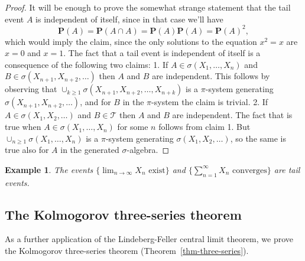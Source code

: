 \documentclass[12pt]{article}
\newcommand{\prob}{\mathbf{P}}
\theoremstyle{example}
\newtheorem{example}[thm]{Example}
\begin{document}
\begin{proof}
It will be enough to prove the somewhat strange statement that the tail event $A$ is independent of itself, since in that case we'll have
$$ \prob(A) = \prob(A\cap A) = \prob(A)\prob(A) = \prob(A)^2, $$
which would imply the claim, since the only solutions to the equation $x^2=x$ are $x=0$ and $x=1$.
The fact that a tail event is independent of itself is a consequence of the following two claims: 1. If $A \in \sigma(X_1,\ldots,X_n)$ and $B\in \sigma(X_{n+1},X_{n+2},\ldots)$ then $A$ and $B$ are independent. This follows by observing that $\cup_{k\ge1} \sigma(X_{n+1},X_{n+2},\ldots,X_{n+k})$ is a $\pi$-system generating $\sigma(X_{n+1},X_{n+2},\ldots)$, and for $B$ in the $\pi$-system the claim is trivial. 2. If $A\in\sigma(X_1,X_2,\ldots)$ and $B\in\mathcal{T}$ then $A$ and $B$ are independent. The fact that is true when $A\in \sigma(X_1,\ldots,X_n)$ for some $n$ follows from claim 1. But $\cup_{n\ge 1} \sigma(X_1,\ldots,X_n)$ is a $\pi$-system generating $\sigma(X_1,X_2,\ldots)$, so the same is true also for $A$ in the generated $\sigma$-algebra.
\end{proof}

\begin{example} The events $\{ \displaystyle \lim_{n\to\infty} X_n\textrm{ exist} \}$ and $\{ \sum_{n=1}^\infty X_n \textrm{ converges} \}$ are tail events.
\end{example}


\subsection{The Kolmogorov three-series theorem \label{sec-k-3-series}}

As a further application of the Lindeberg-Feller central limit theorem, we prove the Kolmogorov three-series theorem (Theorem~\ref{thm-three-series}).
\end{document}
